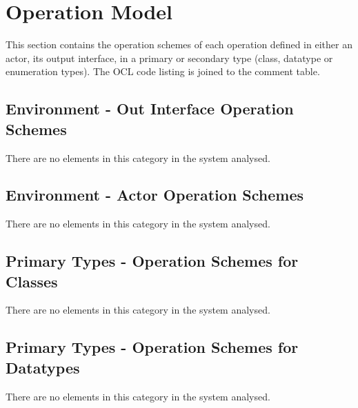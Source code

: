 \chapter{Operation Model}
\label{chap:lu.uni.lassy.excalibur.group03.requirements.analysis-OM}

This section contains the operation schemes of each operation defined in either an actor, its output interface, in a primary or secondary type (class, datatype or enumeration types). 
The \msrmessir OCL code listing is joined to the comment table.

\lstset{
float,
basicstyle=\scriptsize,
language=Messir,
breakatwhitespace=false,
tabsize=2,
breaklines=true,
numbers=left,
emptylines=1,
numbersep=5pt,
showspaces=false,
showstringspaces=false,
showtabs=false
} 



\section{Environment - Out Interface Operation Schemes}
There are no elements in this category in the system analysed.
		


\section{Environment - Actor Operation Schemes}
There are no elements in this category in the system analysed.
		


\section{Primary Types - Operation Schemes for Classes}
There are no elements in this category in the system analysed.




\section{Primary Types - Operation Schemes for Datatypes}
There are no elements in this category in the system analysed.




